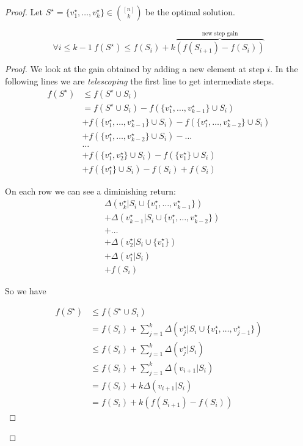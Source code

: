 \begin{proof}
	Let $S^\star = \{v_1^\star, \ldots, v_k^\star\} \in \binom{[n]}{k}$ be the optimal solution.

\begin{lem}\label{lem:smnewstepgain}
	\begin{equation}
		\forall i \leq k-1\ f(S^\star) \leq f(S_i) + k\overbrace{(f(S_{i+1}) -f(S_i))}^{\text{new step gain}}
	\end{equation}
\end{lem}
	\begin{proof}
	We look at the gain obtained by adding a new element at step $i$. In the following lines we are \emph{telescoping} the first line to get intermediate steps.
	\begin{align*}
	f(S^\star) &\leq f(S^\star \cup S_i) \tag{monotonicity}\\
	&= f(S^\star \cup S_i) - f(\{v_1^\star, \ldots, v_{k-1}^\star\} \cup S_i)\\
	& + f(\{v_1^\star, \ldots, v_{k-1}^\star\} \cup S_i) - f(\{v_1^\star, \ldots, v_{k-2}^\star\} \cup S_i) \\
	&+ f(\{v_1^\star, \ldots, v_{k-2}^\star\} \cup S_i) - \ldots \\
	&\ldots\\
	& + f(\{v_1^\star, v_{2}^\star\} \cup S_i) - f(\{v_1^\star\} \cup S_i)\\
	& + f(\{v_1^\star\} \cup S_i) -  f(S_i) + f(S_i)
	\end{align*}

On each row we can see a diminishing return:
\begin{align*}
&\Delta(v_k^\star| S_i \cup \{v_1^\star, \ldots, v_{k-1}^\star\})\\
&+\Delta(v_{k-1}^\star| S_i \cup \{v_1^\star, \ldots, v_{k-2}^\star\})\\
&+\ldots\\
&+\Delta(v_2^\star| S_i \cup \{v_1^\star\})\\
&+\Delta(v_1^\star| S_i)\\
&+f(S_i)
\end{align*}

So we have

\begin{align*}
f(S^\star) &\leq f(S^\star \cup S_i) \tag{monotonicity}\\
&= f(S_i) + \sum_{j=1}^{k}\Delta(v_j^\star|S_i \cup \{v_1^\star,\ldots, v_{j-1}^\star\})\\
&\leq f(S_i) + \sum_{j=1}^{k}\Delta(v_j^\star|S_i) \tag{diminishing returns}\\
&\leq f(S_i) + \sum_{j=1}^{k}\Delta(v_{i+1}|S_i) \tag{greedy choice}\\
&= f(S_i) + k\Delta(v_{i+1}|S_i)\\
&= f(S_i) + k(f(S_{i+1}) - f(S_i))
\end{align*}
\end{proof}


\end{proof}
